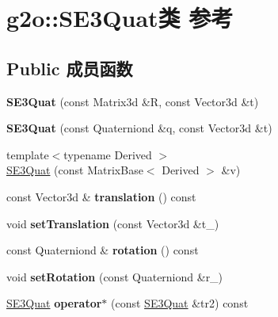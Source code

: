 \hypertarget{classg2o_1_1SE3Quat}{\section{g2o\-:\-:S\-E3\-Quat类 参考}
\label{classg2o_1_1SE3Quat}
}
\subsection*{Public 成员函数}
\begin{DoxyCompactItemize}
\item 
\hypertarget{classg2o_1_1SE3Quat_abb3e9184aa02bf6ced3f6d4cd0825f33}{{\bfseries S\-E3\-Quat} (const Matrix3d \&R, const Vector3d \&t)}\label{classg2o_1_1SE3Quat_abb3e9184aa02bf6ced3f6d4cd0825f33}

\item 
\hypertarget{classg2o_1_1SE3Quat_ab22b3fde9b7e0a833b74b3453041c040}{{\bfseries S\-E3\-Quat} (const Quaterniond \&q, const Vector3d \&t)}\label{classg2o_1_1SE3Quat_ab22b3fde9b7e0a833b74b3453041c040}

\item 
{\footnotesize template$<$typename Derived $>$ }\\\hyperlink{classg2o_1_1SE3Quat_ada36ff00a7a238cef3fe958ff9f7f9cd}{S\-E3\-Quat} (const Matrix\-Base$<$ Derived $>$ \&v)
\item 
\hypertarget{classg2o_1_1SE3Quat_aefb19225648d06b536e143f7d037a65b}{const Vector3d \& {\bfseries translation} () const }\label{classg2o_1_1SE3Quat_aefb19225648d06b536e143f7d037a65b}

\item 
\hypertarget{classg2o_1_1SE3Quat_aaf12f03b09b2a3a4c9185edcc8b141cb}{void {\bfseries set\-Translation} (const Vector3d \&t\-\_\-)}\label{classg2o_1_1SE3Quat_aaf12f03b09b2a3a4c9185edcc8b141cb}

\item 
\hypertarget{classg2o_1_1SE3Quat_a99a34e88f3425dee3d6a9b57c8d265d9}{const Quaterniond \& {\bfseries rotation} () const }\label{classg2o_1_1SE3Quat_a99a34e88f3425dee3d6a9b57c8d265d9}

\item 
\hypertarget{classg2o_1_1SE3Quat_a1f55879ec2e4801d5de4b12b301ff59c}{void {\bfseries set\-Rotation} (const Quaterniond \&r\-\_\-)}\label{classg2o_1_1SE3Quat_a1f55879ec2e4801d5de4b12b301ff59c}

\item 
\hypertarget{classg2o_1_1SE3Quat_a5fe6418e503491a65e3730d82704f6f6}{\hyperlink{classg2o_1_1SE3Quat}{S\-E3\-Quat} {\bfseries operator$\ast$} (const \hyperlink{classg2o_1_1SE3Quat}{S\-E3\-Quat} \&tr2) const }\label{classg2o_1_1SE3Quat_a5fe6418e503491a65e3730d82704f6f6}


\end{DoxyCompactItemize}
